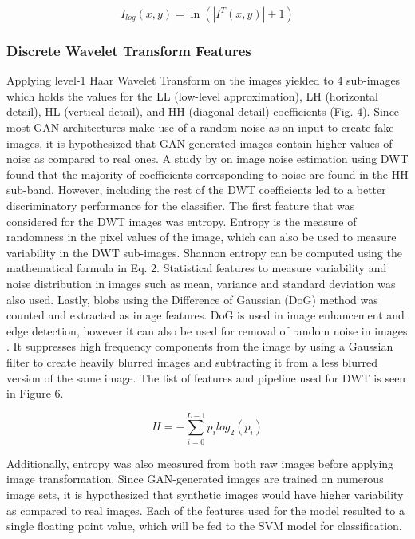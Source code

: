 \documentclass{icsthesis}
\begin{document}
\begin{mainmatter}
\begin{equation}
    I_{log}(x,y) = \ln(|I^{T}(x,y) | + 1)
\end{equation}

\subsubsection{Discrete Wavelet Transform Features}
Applying level-1 Haar Wavelet Transform on the images yielded to 4 sub-images which holds the values for the LL (low-level approximation), LH (horizontal detail), HL (vertical detail), and HH (diagonal detail) coefficients (Fig. 4). Since most GAN architectures make use of a random noise as an input to create fake images, it is hypothesized that GAN-generated images contain higher values of noise as compared to real ones. A study by \cite{dwt-noise}  on image noise estimation using DWT found that the majority of coefficients corresponding to noise are found in the HH sub-band. However, including the rest of the DWT coefficients led to a better discriminatory performance for the classifier. The first feature that was considered for the DWT images was entropy. Entropy is the measure of randomness in the pixel values of the image, which can also be used to measure variability in the DWT sub-images. Shannon entropy can be computed using the mathematical formula in Eq. 2. Statistical features to measure variability and noise distribution in images such as mean, variance and standard deviation was also used. Lastly, blobs using the Difference of Gaussian (DoG) method was counted and extracted as image features. DoG is used in image enhancement and edge detection, however it can also be used for removal of random noise in images \citep{DoG}. It suppresses high frequency components from the image by using a Gaussian filter to create heavily blurred images and subtracting it from a less blurred version of the same image. The list of features and pipeline used for DWT is seen in Figure 6. 

\begin{equation}
   H = − \sum _{i=0}^{L-1}p_{i} log_{2}(p_{i})
\end{equation}

Additionally, entropy was also measured from both raw images before applying image transformation. Since GAN-generated images are trained on numerous image sets, it is hypothesized that synthetic images would have higher variability as compared to real images. Each of the features used for the model resulted to a single floating point value, which will be fed to the SVM model for classification. 


\end{mainmatter}
\end{document}
